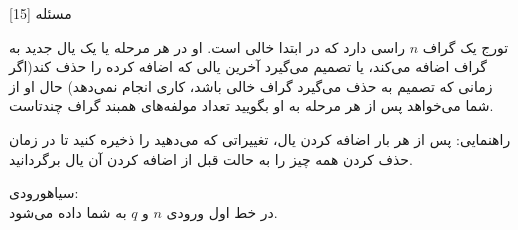 ‌مسئله [15]


% 
%
%
% 
تورج یک گراف 
$n$
راسی دارد که در ابتدا خالی است.
او در هر مرحله یا یک یال جدید به گراف اضافه می‌کند، یا تصمیم می‌گیرد آخرین یالی که اضافه کرده را حذف کند(اگر زمانی که تصمیم به حذف می‌گیرد گراف خالی باشد، کاری انجام نمی‌دهد)
حال او از شما می‌خواهد پس از هر مرحله به او بگویید تعداد مولفه‌های همبند گراف چند‌تاست.

راهنمایی: پس از هر بار اضافه کردن یال، تغییراتی که می‌دهید را ذخیره کنید تا در زمان حذف کردن همه چیز را به حالت قبل از اضافه کردن آن یال برگردانید.

\noindent
{}‌سیاه{ورودی:}\\
در خط اول ورودی 
$n$
و 
$q$
به شما داده می‌شود.


